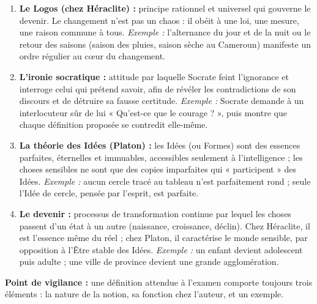 \documentclass[11pt]{article}
\newcommand{\cle}[1]{{\popxbold\color{popdark}#1}}
\begin{document}
\begin{corrige}
\begin{enumerate}
\item \textbf{Le \cle{Logos} (chez Héraclite) :} principe rationnel et universel qui gouverne le devenir. Le changement n'est pas un chaos : il obéit à une loi, une mesure, une raison commune à tous. \emph{Exemple :} l'alternance du jour et de la nuit ou le retour des saisons (saison des pluies, saison sèche au Cameroun) manifeste un ordre régulier au cœur du changement.
\item \textbf{L'\cle{ironie} socratique :} attitude par laquelle Socrate feint l'ignorance et interroge celui qui prétend savoir, afin de révéler les contradictions de son discours et de détruire sa fausse certitude. \emph{Exemple :} Socrate demande à un interlocuteur sûr de lui « Qu'est-ce que le courage ? », puis montre que chaque définition proposée se contredit elle-même.
\item \textbf{La théorie des \cle{Idées} (Platon) :} les Idées (ou Formes) sont des essences parfaites, éternelles et immuables, accessibles seulement à l'intelligence ; les choses sensibles ne sont que des copies imparfaites qui « participent » des Idées. \emph{Exemple :} aucun cercle tracé au tableau n'est parfaitement rond ; seule l'Idée de cercle, pensée par l'esprit, est parfaite.
\item \textbf{Le \cle{devenir} :} processus de transformation continue par lequel les choses passent d'un état à un autre (naissance, croissance, déclin). Chez Héraclite, il est l'essence même du réel ; chez Platon, il caractérise le monde sensible, par opposition à l'Être stable des Idées. \emph{Exemple :} un enfant devient adolescent puis adulte ; une ville de province devient une grande agglomération.
\end{enumerate}
\textbf{Point de vigilance :} une définition attendue à l'examen comporte toujours trois éléments : la nature de la notion, sa fonction chez l'auteur, et un exemple.
\end{corrige}
\end{document}
